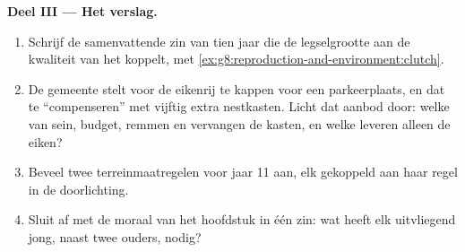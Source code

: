 \begin{problem}
\medskip\noindent\textbf{Deel III --- Het verslag.}
\begin{enumerate}[resume]
  \item Schrijf de samenvattende zin van tien jaar die de legselgrootte
        aan de kwaliteit van het  koppelt, met
        \cref{ex:g8:reproduction-and-environment:clutch}.
  \item De gemeente stelt voor de eikenrij te kappen voor een
        parkeerplaats, en dat te ``compenseren'' met vijftig extra
        nestkasten. Licht dat aanbod door: welke van sein, budget, remmen
        en  vervangen de kasten, en welke leveren alleen de
        eiken?
  \item Beveel twee terreinmaatregelen voor jaar 11 aan, elk gekoppeld aan
        haar regel in de doorlichting.
  \item Sluit af met de moraal van het hoofdstuk in één zin: wat heeft elk
        uitvliegend jong, naast twee ouders, nodig?
\end{enumerate}
\end{problem}
